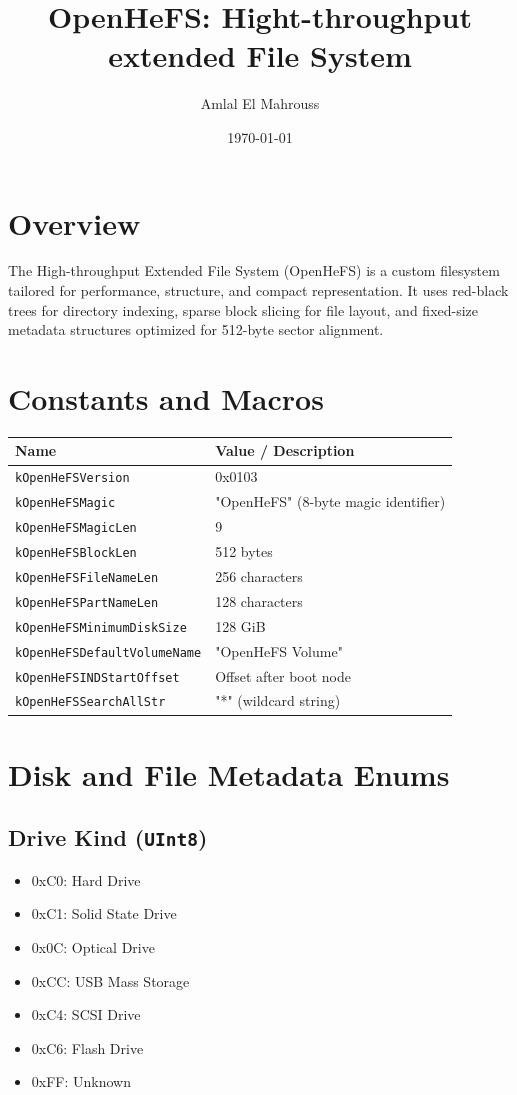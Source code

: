 \documentclass{article}
\title{OpenHeFS: Hight-throughput extended File System}
\author{Amlal El Mahrouss}
\date{\today}
\begin{document}
\maketitle

\section{Overview}
The High-throughput Extended File System (OpenHeFS) is a custom filesystem tailored for performance, structure, and compact representation. It uses red-black trees for directory indexing, sparse block slicing for file layout, and fixed-size metadata structures optimized for 512-byte sector alignment.

\section{Constants and Macros}
\begin{longtable}{|l|l|}
\hline
\textbf{Name} & \textbf{Value / Description} \\
\hline
\texttt{kOpenHeFSVersion} & 0x0103 \\
\texttt{kOpenHeFSMagic} & "OpenHeFS" (8-byte magic identifier) \\
\texttt{kOpenHeFSMagicLen} & 9 \\
\texttt{kOpenHeFSBlockLen} & 512 bytes \\
\texttt{kOpenHeFSFileNameLen} & 256 characters \\
\texttt{kOpenHeFSPartNameLen} & 128 characters \\
\texttt{kOpenHeFSMinimumDiskSize} & 128 GiB \\
\texttt{kOpenHeFSDefaultVolumeName} & "OpenHeFS Volume" \\
\texttt{kOpenHeFSINDStartOffset} & Offset after boot node \\
\texttt{kOpenHeFSSearchAllStr} & "*" (wildcard string) \\
\hline
\end{longtable}

\section{Disk and File Metadata Enums}\label{sec:disk-and-file-metadata-enums}

\subsection{Drive Kind (\texttt{UInt8})}\label{subsec:drive-kind-(texttt{uint8})}
\begin{itemize}
\item 0xC0: Hard Drive
\item 0xC1: Solid State Drive
\item 0x0C: Optical Drive
\item 0xCC: USB Mass Storage
\item 0xC4: SCSI Drive
\item 0xC6: Flash Drive
\item 0xFF: Unknown
\end{itemize}
\end{document}
